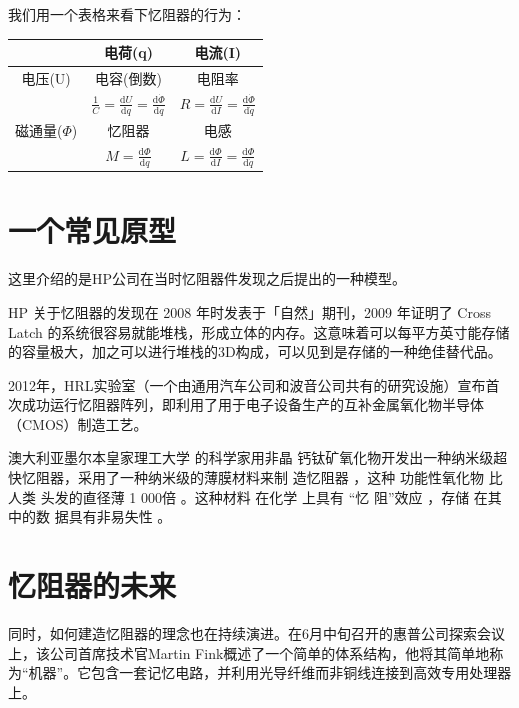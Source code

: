 \documentclass[UTF8]{article}
\begin{document}
我们用一个表格来看下忆阻器的行为：

\begin{tabular}{|c|c|c|}
\hline
& 电荷(q)& 电流(I) \\

 \hline
电压(U)  & 电容(倒数) &电阻率 \\
     & $\frac{1}{C}=\frac{\mathrm{d}U}{\mathrm{d}q}=\frac{\mathrm{d}\dot \Phi}{\mathrm{d}q}$  &   $R=\frac{\mathrm{d}U}{\mathrm{d}I}=\frac{\mathrm{d}\dot \Phi}{\mathrm{d}\dot{q}}$ \\
 \hline
磁通量($\Phi$)  & 忆阻器 & 电感 \\
     & $M=\frac{\mathrm{d}\Phi}{\mathrm{d}q}$  &  $L=\frac{\mathrm{d}\Phi}{\mathrm{d}I}=\frac{\mathrm{d}\Phi}{\mathrm{d}\dot{q}}$ \\
 \hline

\end{tabular}







\section{一个常见原型}
这里介绍的是HP公司在当时忆阻器件发现之后提出的一种模型。



HP 关于忆阻器的发现在 2008 年时发表于「自然」期刊，2009 年证明了 Cross Latch 的系统很容易就能堆栈，形成立体的内存。这意味着可以每平方英寸能存储的容量极大，加之可以进行堆栈的3D构成，可以见到是存储的一种绝佳替代品。

2012年，HRL实验室（一个由通用汽车公司和波音公司共有的研究设施）宣布首次成功运行忆阻器阵列，即利用了用于电子设备生产的互补金属氧化物半导体（CMOS）制造工艺。

澳大利亚墨尔本皇家理工大学 的科学家用非晶 钙钛矿氧化物开发出一种纳米级超快忆阻器，采用了一种纳米级的薄膜材料来制 造忆阻器 ，这种 功能性氧化物 比人类 头发的直径薄 1 000倍 。这种材料 在化学 上具有 “忆 阻”效应 ，存储 在其 中的数 据具有非易失性 。 



\section{忆阻器的未来}
 同时，如何建造忆阻器的理念也在持续演进。在6月中旬召开的惠普公司探索会议上，该公司首席技术官Martin Fink概述了一个简单的体系结构，他将其简单地称为“机器”。它包含一套记忆电路，并利用光导纤维而非铜线连接到高效专用处理器上。
\end{document}
